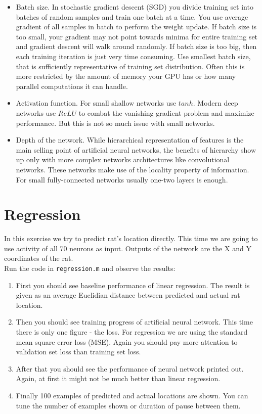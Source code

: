 \documentclass[a4paper,11pt]{article}
\begin{document}
\begin{itemize}
	\item Batch size. In stochastic gradient descent (SGD) you divide training set into batches of random samples and train one batch at a time. You use average gradient of all samples in batch to perform the weight update. If batch size is too small, your gradient may not point towards minima for entire training set and gradient descent will walk around randomly. If batch size is too big, then each training iteration is just very time consuming. Use smallest batch size, that is sufficiently representative of training set distribution. Often this is more restricted by the amount of memory your GPU has or how many parallel computations it can handle.
	\item Activation function. For small shallow networks use $tanh$. Modern deep networks use $ReLU$ to combat the vanishing gradient problem and maximize performance. But this is not so much issue with small networks.
	\item Depth of the network. While hierarchical representation of features is the main selling point of artificial neural networks, the benefits of hierarchy show up only with more complex networks architectures like convolutional networks. These networks make use of the locality property of information. For small fully-connected networks usually one-two layers is enough.
 \end{itemize}

%
%
\section{Regression}

In this exercise we try to predict rat's location directly. This time we are going to use activity of all 70 neurons as input. Outputs of the network are the X and Y coordinates of the rat.\\

Run the code in \texttt{regression.m} and observe the results:

\begin{enumerate}
	\item First you should see baseline performance of linear regression. The result is given as an average Euclidian distance between predicted and actual rat location.
	\item Then you should see training progress of artificial neural network. This time there is only one figure - the loss. For regression we are using the standard mean square error loss (MSE). Again you should pay more attention to validation set loss than training set loss.
	\item After that you should see the performance of neural network printed out. Again, at first it might not be much better than linear regression.
	\item Finally 100 examples of predicted and actual locations are shown. You can tune the number of examples shown or duration of pause between them.
\end{enumerate}
\end{document}
